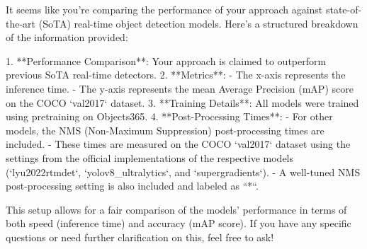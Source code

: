 It seems like you're comparing the performance of your approach against state-of-the-art (SoTA) real-time object detection models. Here's a structured breakdown of the information provided:

1. **Performance Comparison**: Your approach is claimed to outperform previous SoTA real-time detectors.
2. **Metrics**:
   - The x-axis represents the inference time.
   - The y-axis represents the mean Average Precision (mAP) score on the COCO `val2017` dataset.
3. **Training Details**: All models were trained using pretraining on Objects365.
4. **Post-Processing Times**: 
   - For other models, the NMS (Non-Maximum Suppression) post-processing times are included.
   - These times are measured on the COCO `val2017` dataset using the settings from the official implementations of the respective models (`lyu2022rtmdet`, `yolov8_ultralytics`, and `supergradients`).
   - A well-tuned NMS post-processing setting is also included and labeled as ``*``.

This setup allows for a fair comparison of the models' performance in terms of both speed (inference time) and accuracy (mAP score). If you have any specific questions or need further clarification on this, feel free to ask!